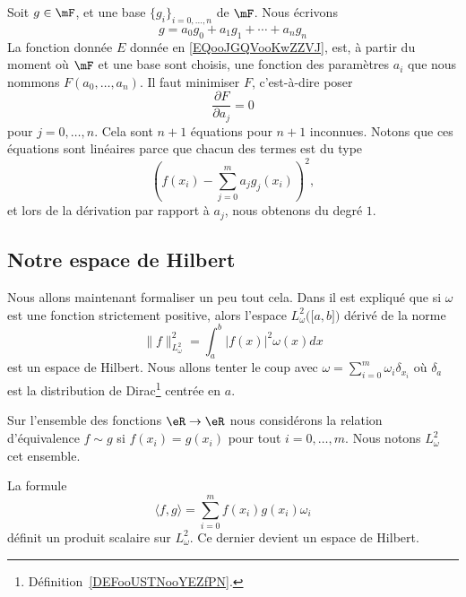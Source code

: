 Soit \( g\in \mF\), et une base \( \{ g_i \}_{i=0,\ldots, n}\) de \( \mF\). Nous écrivons
\begin{equation}
	g=a_0g_0+a_1g_1+\cdots +a_ng_n
\end{equation}
La fonction donnée \( E\) donnée en \eqref{EQooJGQVooKwZZVJ}, est, à partir du moment où \( \mF\) et une base sont choisis, une fonction des paramètres \( a_i\) que nous nommons \( F(a_0,\ldots, a_n)\). Il faut minimiser \( F\), c'est-à-dire poser
\begin{equation}
	\frac{ \partial F }{ \partial a_j }=0
\end{equation}
pour \( j=0,\ldots, n\). Cela sont \( n+1\) équations pour \( n+1\) inconnues. Notons que ces équations sont linéaires parce que chacun des termes est du type
\begin{equation}
	\left( f(x_i)-\sum_{j=0}^ma_jg_j(x_i) \right)^2,
\end{equation}
et lors de la dérivation par rapport à \( a_j\), nous obtenons du degré \( 1\).

\subsection{Notre espace de Hilbert}

Nous allons maintenant formaliser un peu tout cela. Dans \cite{ooPTFGooScbUWC} il est expliqué que si \( \omega\) est une fonction strictement positive, alors l'espace \( L^2_{\omega}\big( \mathopen[ a , b \mathclose] \big)\) dérivé de la norme
\begin{equation}
	\| f \|_{L^2_{\omega}}^2=\int_a^b| f(x) |^2\omega(x)dx
\end{equation}
est un espace de Hilbert. Nous allons tenter le coup avec \( \omega=\sum_{i=0}^m\omega_i\delta_{x_i}\) où \( \delta_a\) est la distribution de Dirac\footnote{Définition~\ref{DEFooUSTNooYEZfPN}.} centrée en \( a\).

Sur l'ensemble des fonctions \( \eR\to\eR\) nous considérons la relation d'équivalence \( f\sim g\) si \( f(x_i)=g(x_i)\) pour tout \( i=0,\ldots, m\). Nous notons \(  L^2_{\omega}  \) cet ensemble.

\begin{proposition}
	La formule
	\begin{equation}        \label{EQooVUKMooIjpkXO}
		\langle f, g\rangle =\sum_{i=0}^mf(x_i)g(x_i)\omega_i
	\end{equation}
	définit un produit scalaire sur \( L^2_{\omega}\). Ce dernier devient un espace de Hilbert.
\end{proposition}

